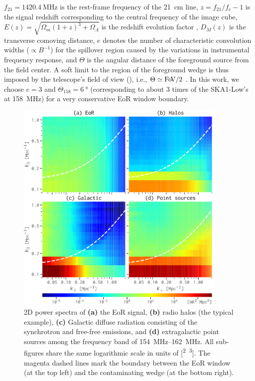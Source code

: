 \documentclass[modern]{aastex62}
\newcommand{\fov}{\text{Fo\!V}}
\begin{document}
$f_{21} = \SI{1420.4}{\MHz}$ is the rest-frame frequency of the 21~cm line,
$z = f_{21}/f_c - 1$ is the signal redshift corresponding to the central
frequency of the image cube,
$E(z) = \sqrt{\Omega_m(1+z)^3 + \Omega_{\Lambda}}$ is the redshift
evolution factor \citep{hogg1999},
$D_{\!M}(z)$ is the transverse comoving distance,
$e$ denotes the number of characteristic convolution widths
($\propto B^{-1}$) for the spillover region caused by the variations in
instrumental frequency response,
and $\Theta$ is the angular distance of the foreground source from
the field center.
A soft limit to the region of the foreground wedge is thus imposed by the
telescope's field of view (\fov), i.e., $\Theta \simeq \fov/2$
\citep{morales2012}.
In this work, we choose $e = 3$ and $\Theta_{158} = \SI{6}{\degree}$
(corresponding to about 3 times of the SKA1-Low's \fov{} at
\SI{158}{\MHz}) for a very conservative EoR window boundary.

\begin{figure}
  \centering
  \includegraphics[width=0.9\textwidth]{ps2d-band158}
  \caption{\label{fig:ps2d}%
    2D power spectra of
    \textbf{(a)} the EoR signal,
    \textbf{(b)} radio halos (the typical example),
    \textbf{(c)} Galactic diffuse radiation consisting of the synchrotron
    and free-free emissions,
    and
    \textbf{(d)} extragalactic point sources
    among the frequency band of \SIrange{154}{162}{\MHz}.
    All sub-figures share the same logarithmic scale in units of
    [\si{\mK\squared\Mpc\cubed}].
    The magenta dashed lines mark the boundary between the EoR window
    (at the top left) and the contaminating wedge (at the bottom right).
  }
\end{figure}
\end{document}
